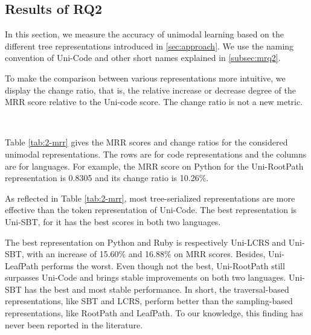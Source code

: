 \documentclass[conference]{IEEEtran}
\begin{document}
\subsection{Results of RQ2}

In this section, we measure the accuracy of unimodal learning based on the different tree representations introduced in \autoref{sec:approach}. We use the naming convention of Uni-Code and other short names explained in \autoref{subsec:mrq2}. 

To make the comparison between various representations more intuitive, we display the change ratio, that is, the relative increase or decrease degree of the MRR score relative to the Uni-code score. The change ratio is not a new metric.

\begin{table}[thb]
\centering
\caption{RQ2: MRR Scores of Unimodal Representations. Uni-LCRS can be considered the best representation.}
~\\
\label{tab:2-mrr}
\end{table}
 

Table \ref{tab:2-mrr} gives the MRR scores and change ratios for the considered unimodal representations. The rows are for code representations and the columns are for languages. For example, the MRR score on Python for the Uni-RootPath representation is 0.8305 and its change ratio is 10.26\%.

As reflected in Table \ref{tab:2-mrr}, most tree-serialized representations are more effective than the token representation of Uni-Code. The best representation is Uni-SBT, for it has the best scores in both two languages.

The best representation on Python and Ruby is respectively Uni-LCRS and Uni-SBT, with an increase of 15.60\% and 16.88\% on MRR scores. Besides, Uni-LeafPath performs the worst. Even though not the best, Uni-RootPath still surpasses Uni-Code and brings stable improvements on both two languages. Uni-SBT has the best and most stable performance. In short, the traversal-based representations, like SBT and LCRS, perform better than the sampling-based representations, like RootPath and LeafPath. To our knowledge, this finding has never been reported in the literature.
\end{document}
